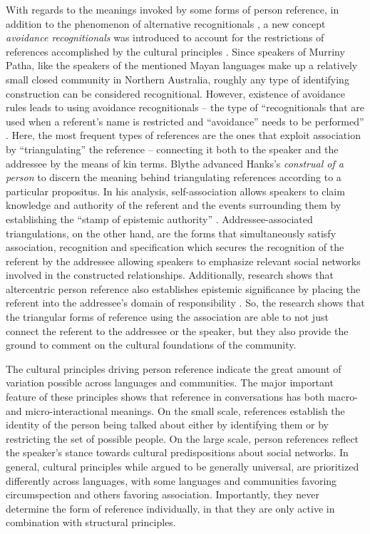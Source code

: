 \documentclass[12pt]{article}
\begin{document}
With regards to the meanings invoked by some forms of person reference, in addition to the phenomenon of alternative recognitionals \parencite{stivers2007}, a new concept \textit{avoidance recognitionals} was introduced to account for the restrictions of references accomplished by the cultural principles \parencite{blythe2009}. Since speakers of Murriny Patha, like the speakers of the mentioned Mayan languages make up a relatively small closed community in Northern Australia, roughly any type of identifying construction can be considered recognitional. However, existence of avoidance rules leads to using avoidance recognitionals -- the type of ``recognitionals that are used when a referent's name is restricted and ``avoidance'' needs to be performed'' \textcite[p. 213]{blythe2009}. Here, the most frequent types of references are the ones that exploit association by ``triangulating'' the reference -- connecting it both to the speaker and the addressee by the means of kin terms. Blythe advanced Hanks's \textit{construal of a person} to discern the meaning behind triangulating references according to a particular propositus. In his analysis, self-association allows speakers to claim knowledge and authority of the referent and the events surrounding them by establishing the ``stamp of epistemic authority'' \parencite[p. 231]{blythe2009}. Addressee-associated triangulations, on the other hand, are the forms that simultaneously satisfy association, recognition and specification which secures the recognition of the referent by the addressee allowing speakers to emphasize relevant social networks involved in the constructed relationships. Additionally, research shows that altercentric person reference also establishes epistemic significance by placing the referent into the addressee's domain of responsibility \parencite{stivers2007}. So, the research shows that the triangular forms of reference using the association are able to not just connect the referent to the addressee or the speaker, but they also provide the ground to comment on the cultural foundations of the community.

The cultural principles driving person reference indicate the great amount of variation possible across languages and communities. The major important feature of these principles shows that reference in conversations has both macro- and micro-interactional meanings. On the small scale, references establish the identity of the person being talked about either by identifying them or by restricting the set of possible people. On the large scale, person references reflect the speaker's stance towards cultural predispositions about social networks. In general, cultural principles while argued to be generally universal, are prioritized differently across languages, with some languages and communities favoring circumspection and others favoring association. Importantly, they never determine the form of reference individually, in that they are only active in combination with structural principles.
\end{document}

